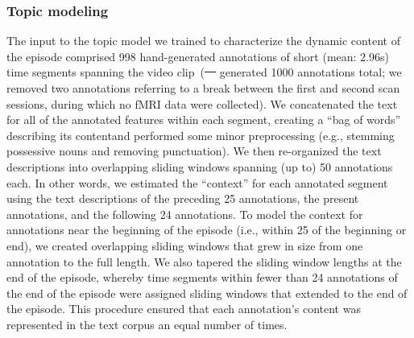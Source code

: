 \documentclass[10pt]{article}
\renewcommand{\includegraphics}[2][]{} %
\providecommand{\DIFaddtex}[1]{{\protect\color{blue}\uwave{#1}}} %
\providecommand{\DIFdeltex}[1]{{\protect\color{red}\sout{#1}}}                      %
\providecommand{\DIFaddbegin}{} %
\providecommand{\DIFaddend}{} %
\providecommand{\DIFdelbegin}{} %
\providecommand{\DIFdelend}{} %
\providecommand{\DIFadd}[1]{\texorpdfstring{\DIFaddtex{#1}}{#1}} %
\providecommand{\DIFdel}[1]{\texorpdfstring{\DIFdeltex{#1}}{}} %
\newcommand{\DIFscaledelfig}{0.5}
\newlength{\DIFdelgraphicswidth} %
\newlength{\DIFdelgraphicsheight} %
\newcommand{\DIFaddincludegraphics}[2][]{{\color{blue}\fbox{\DIFOincludegraphics[#1]{#2}}}} %
\newcommand{\DIFdelincludegraphics}[2][]{%
\sbox{\DIFdelgraphicsbox}{\DIFOincludegraphics[#1]{#2}}%
\settoboxwidth{\DIFdelgraphicswidth}{\DIFdelgraphicsbox} %
\settoboxtotalheight{\DIFdelgraphicsheight}{\DIFdelgraphicsbox} %
\scalebox{\DIFscaledelfig}{%
\parbox[b]{\DIFdelgraphicswidth}{\usebox{\DIFdelgraphicsbox}\\[-\baselineskip] \rule{\DIFdelgraphicswidth}{0em}}\llap{\resizebox{\DIFdelgraphicswidth}{\DIFdelgraphicsheight}{%
\setlength{\unitlength}{\DIFdelgraphicswidth}%
\begin{picture}(1,1)%
\thicklines\linethickness{2pt} %
{\color[rgb]{1,0,0}\put(0,0){\framebox(1,1){}}}%
{\color[rgb]{1,0,0}\put(0,0){\line( 1,1){1}}}%
{\color[rgb]{1,0,0}\put(0,1){\line(1,-1){1}}}%
\end{picture}%
}\hspace*{3pt}}} %
} %
\DeclareRobustCommand{\DIFaddbegin}{\DIFOaddbegin \let\includegraphics\DIFaddincludegraphics} %
\DeclareRobustCommand{\DIFaddend}{\DIFOaddend \let\includegraphics\DIFOincludegraphics} %
\DeclareRobustCommand{\DIFdelbegin}{\DIFOdelbegin \let\includegraphics\DIFdelincludegraphics} %
\DeclareRobustCommand{\DIFdelend}{\DIFOaddend \let\includegraphics\DIFOincludegraphics} %
\begin{document}
\subsubsection*{Topic modeling}
The input to the topic model we trained to characterize the dynamic content of the episode comprised 998 hand-generated annotations of short (mean: 2.96s) time segments spanning the video clip~(\DIFdelbegin \DIFdel{\mbox{%
\citealp{ChenEtal17} }\hspace{0pt}%
}\DIFdelend \DIFaddbegin \DIFadd{Chen et al., 2017~\mbox{%
\citep{ChenEtal17} }\hspace{0pt}%
}\DIFaddend generated 1000 annotations total; we removed two annotations referring to a break between the first and second scan sessions, during which no fMRI data were collected).  We concatenated the text for all of the annotated features within each segment, creating a ``bag of words'' describing its content\DIFaddbegin \DIFadd{, }\DIFaddend and performed some minor preprocessing (e.g., stemming possessive nouns and removing punctuation).  We then re-organized the text descriptions into overlapping sliding windows spanning (up to) 50 annotations each.  In other words, we estimated the ``context'' for each annotated segment using the text descriptions of the preceding 25 annotations, the present annotations, and the following 24 annotations.  To model the context for annotations near the beginning of the episode (i.e., within 25 of the beginning or end), we created overlapping sliding windows that grew in size from one annotation to the full length.  We also tapered the sliding window lengths at the end of the episode, whereby time segments within fewer than 24 annotations of the end of the episode were assigned sliding windows that extended to the end of the episode.  This procedure ensured that each annotation's content was represented in the text corpus an equal number of times.
\end{document}
